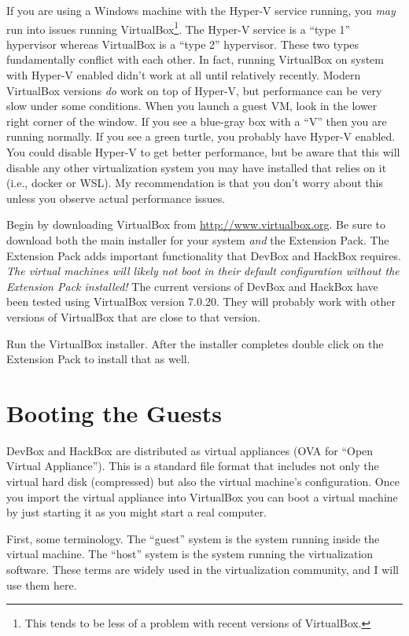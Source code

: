 \documentclass{article}
\begin{document}
If you are using a Windows machine with the Hyper-V service running, you \emph{may} run into
issues running VirtualBox\footnote{This tends to be less of a problem with recent versions of
VirtualBox.}. The Hyper-V service is a ``type 1'' hypervisor whereas VirtualBox is a ``type 2''
hypervisor. These two types fundamentally conflict with each other. In fact, running VirtualBox
on system with Hyper-V enabled didn't work at all until relatively recently. Modern VirtualBox
versions \emph{do} work on top of Hyper-V, but performance can be very slow under some
conditions. When you launch a guest VM, look in the lower right corner of the window. If you see
a blue-gray box with a ``V'' then you are running normally. If you see a green turtle, you
probably have Hyper-V enabled. You could disable Hyper-V to get better performance, but be aware
that this will disable any other virtualization system you may have installed that relies on it
(i.e., docker or WSL). My recommendation is that you don't worry about this unless you observe
actual performance issues.

Begin by downloading VirtualBox from \url{http://www.virtualbox.org}. Be sure to download both
the main installer for your system \emph{and} the Extension Pack. The Extension Pack adds
important functionality that DevBox and HackBox requires. \emph{The virtual machines will likely
not boot in their default configuration without the Extension Pack installed!} The current
versions of DevBox and HackBox have been tested using VirtualBox version 7.0.20. They will
probably work with other versions of VirtualBox that are close to that version.

Run the VirtualBox installer. After the installer completes double click on the Extension Pack
to install that as well.

\section{Booting the Guests}
\label{sec:booting-guests}

DevBox and HackBox are distributed as virtual appliances (OVA for ``Open Virtual Appliance'').
This is a standard file format that includes not only the virtual hard disk (compressed) but
also the virtual machine's configuration. Once you import the virtual appliance into VirtualBox
you can boot a virtual machine by just starting it as you might start a real computer.

First, some terminology. The ``guest'' system is the system running inside the virtual machine.
The ``host'' system is the system running the virtualization software. These terms are widely
used in the virtualization community, and I will use them here.
\end{document}
